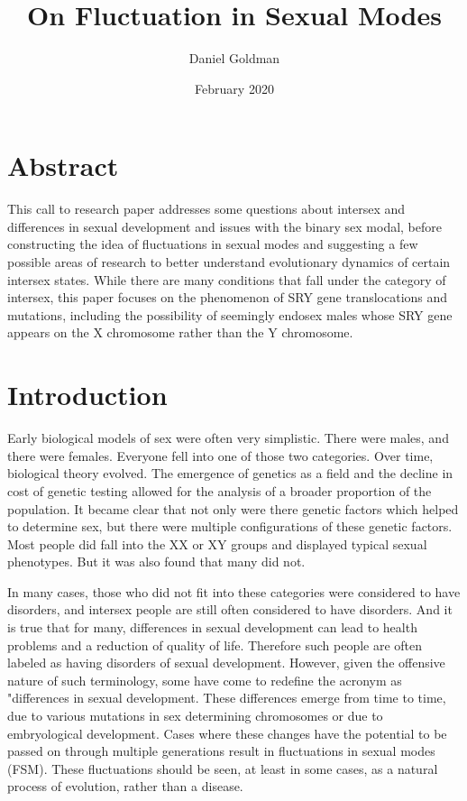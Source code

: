 \documentclass{article}
\title{On Fluctuation in Sexual Modes}
\author{Daniel Goldman}
\date{February 2020}
\begin{document}
\maketitle
\section{Abstract}
This call to research paper addresses some questions about intersex and differences in sexual development and issues with the binary sex modal, before constructing the idea of fluctuations in sexual modes and suggesting a few possible areas of research to better understand evolutionary dynamics of certain intersex states. While there are many conditions that fall under the category of intersex, this paper focuses on the phenomenon of SRY gene translocations and mutations, including the possibility of seemingly endosex males whose SRY gene appears on the X chromosome rather than the Y chromosome. 
\section{Introduction}
Early biological models of sex were often very simplistic. There were males, and there were females. Everyone fell into one of those two categories. Over time, biological theory evolved. The emergence of genetics as a field and the decline in cost of genetic testing allowed for the analysis of a broader proportion of the population. It became clear that not only were there genetic factors which helped to determine sex, but there were multiple configurations of these genetic factors. Most people did fall into the XX or XY groups and displayed typical sexual phenotypes. But it was also found that many did not. 

In many cases, those who did not fit into these categories were considered to have disorders, and intersex people are still often considered to have disorders. And it is true that for many, differences in sexual development can lead to health problems and a reduction of quality of life. Therefore such people are often labeled as having disorders of sexual development. However, given the offensive nature of such terminology, some have come to redefine the acronym as "differences in sexual development. These differences emerge from time to time, due to various mutations in sex determining chromosomes or due to embryological development. Cases where these changes have the potential to be passed on through multiple generations result in fluctuations in sexual modes (FSM). These fluctuations should be seen, at least in some cases, as a natural process of evolution, rather than a disease.  
\end{document}
